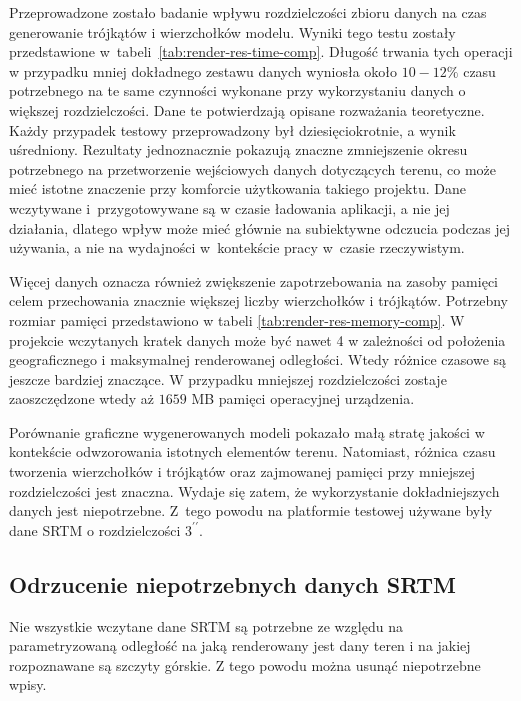 Przeprowadzone zostało badanie wpływu rozdzielczości zbioru danych na czas generowanie trójkątów i wierzchołków modelu. Wyniki tego testu zostały przedstawione w~tabeli~\ref{tab:render-res-time-comp}. Długość trwania tych operacji w przypadku mniej dokładnego zestawu danych wyniosła około $10-12\%$ czasu potrzebnego na te same czynności wykonane przy wykorzystaniu danych o większej rozdzielczości. Dane te potwierdzają opisane rozważania teoretyczne. Każdy przypadek testowy przeprowadzony był dziesięciokrotnie, a wynik uśredniony. Rezultaty jednoznacznie pokazują znaczne zmniejszenie okresu potrzebnego na przetworzenie wejściowych danych dotyczących terenu, co może mieć istotne znaczenie przy komforcie użytkowania takiego projektu. Dane wczytywane i~przygotowywane są w czasie ładowania aplikacji, a nie jej działania, dlatego wpływ może mieć głównie na subiektywne odczucia podczas jej używania, a nie na wydajności w~kontekście pracy w~czasie rzeczywistym. 



Więcej danych oznacza również zwiększenie zapotrzebowania na zasoby pamięci celem przechowania znacznie większej liczby wierzchołków i trójkątów. Potrzebny rozmiar pamięci przedstawiono w tabeli \ref{tab:render-res-memory-comp}. W projekcie wczytanych kratek danych może być nawet 4 w zależności od położenia geograficznego i maksymalnej renderowanej odległości. Wtedy różnice czasowe są jeszcze bardziej znaczące. W przypadku mniejszej rozdzielczości zostaje zaoszczędzone wtedy aż $1659$ MB pamięci operacyjnej urządzenia. 



Porównanie graficzne wygenerowanych modeli pokazało małą stratę jakości w kontekście odwzorowania istotnych elementów terenu. Natomiast, różnica czasu tworzenia wierzchołków i trójkątów oraz zajmowanej pamięci przy mniejszej rozdzielczości jest znaczna. Wydaje się zatem, że wykorzystanie dokładniejszych danych jest niepotrzebne. Z~tego powodu na platformie testowej używane były dane SRTM o rozdzielczości $3^{\prime\prime}$.




\subsection{Odrzucenie niepotrzebnych danych SRTM} \label{sec:niepotrzebne_srtm}

Nie wszystkie wczytane dane SRTM są potrzebne ze względu na parametryzowaną odległość na jaką renderowany jest dany teren i na jakiej rozpoznawane są szczyty górskie. Z tego powodu można usunąć niepotrzebne wpisy.

